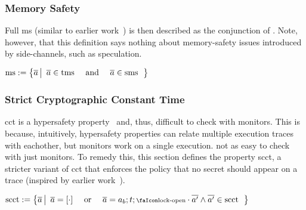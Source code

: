 \documentclass[utf8,acmsmall,review,screen,dvipsnames,anonymous]{acmart}
\begin{document}
\subsubsection{Memory Safety}

Full \gls{ms} (similar to earlier work~\cite{nagarakatte2009soft,nagarakatte2010cets,jim2002cyclone,necula2005ccured,michael2023mswasm}) is then described as the conjunction of .
Note, however, that this definition says nothing about memory-safety issues introduced by side-channels, such as speculation.

\begin{definition}[\glsfirst{ms}]\label{def:trace:msdef}
  $
  \operatorname{ms}:=\left\{\overline{a} \left|\begin{array}{rcl}
                                 \overline{a}\in\operatorname{tms} & \text{ and } & \overline{a}\in\operatorname{sms}
                               \end{array}\right.\right\}
  $
\end{definition}

\subsubsection{Strict Cryptographic Constant Time}

\gls{cct} is a hypersafety property~\cite{barthe2018sec} and, thus, difficult to check with monitors.
This is because, intuitively, hypersafety properties can relate multiple execution traces with eachother, but monitors work on a single execution. not as easy to check with just monitors.
To remedy this, this section defines the property \gls{scct}, a stricter variant of \gls{cct} that enforces the policy that no secret should appear on a trace (inspired by earlier work~\cite{almeida2017jasmin}).

\begin{definition}\label{def:trace:scctdef}
  $
  \scctsafe:=\left\{\trace \left|\begin{array}{rcl}
                                   \trace=\hole{\cdot} & \text{ or } & \trace=\event[_{b}];\sandboxtag;\unlock\cdot\trace['] \wedge \trace[']\in\scctsafe
                                 \end{array}\right.\right\}
  $
\end{definition}
\end{document}
